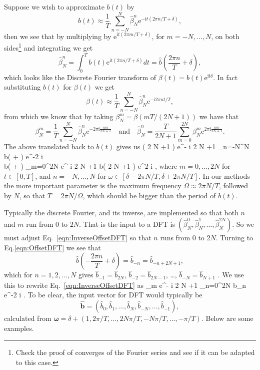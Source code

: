 \documentclass[ 12pt, a4paper]{article}
\newcommand{\be}{\begin{equation}}
\newcommand{\en}{\end{equation}}
\def\bga#1\ega{\begin{gather}#1\end{gather}} %
\newcommand{\ii}{\textrm{i}}
\newcommand{\ee}{\textrm{e}}
\renewcommand{\vec}[1]{\boldsymbol{#1}}
\begin{document}
Suppose we wish to approximate $b(t)$ by
\be
b(t) \approx \frac{1}{T}\sum_{n=-N}^N \hat \beta^n_N \ee^{-\ii t( 2 \pi n/T + \delta)},
\en
then we see that by multiplying by $\ee^{\ii t( 2 \pi m/T + \delta)}$, for $m= -N, \ldots, N$, on both sides\footnote{Check the proof of converges of the Fourier series and see if it can be adapted to this case.} and integrating we get
\be
\hat \beta^n_N = \int_0^T b(t) \ee^{\ii t( 2 \pi n/T + \delta)} dt = \hat b\left (\frac{ 2 \pi n}{T} + \delta \right),
\en
which looks like the Discrete Fourier transform of $\beta(t) = b(t)\ee^{\ii t \delta}$. In fact substituting $b(t)$ for $\beta(t)$ we get
\be
\beta(t) \approx \frac{1}{T}\sum_{n=-N}^N \hat \beta^n_N \ee^{-\ii  2 \pi n t /T },
\en
from which we know that by taking $\beta_N^m = \beta(m T /(2 N +1))$ we have that
\be
\beta_N^m = \frac{1}{T}\sum_{n=-N}^N \hat \beta^n_N \ee^{-2 \pi \ii \frac{n m}{2 N +1} } \quad \text{and}  \quad
 \hat \beta_N^n = \frac{T}{2N +1}\sum_{m=0}^{2N} \beta^m_N \ee^{2 \pi \ii \frac{n m}{2 N +1} }.
\en
 The above translated back to $b(t)$ gives us
\bga
b\left ( {2 N +1} \right) \approx \ee^{- \ii \delta {} {2 N +1}} \sum_{n=-N}^N  \hat b\left ( + \delta \right) \ee^{-2 \pi \ii {} } \quad {}
\label{eqn:InverseOffsetDFT} \\
 \hat b\left ( + \delta \right) \approx {}\sum_{m=0}^{2N} \ee^{ \ii \delta {} {2 N +1}}  b\left ( {2 N +1} \right)  \ee^{2 \pi \ii {} },
 \label{eqn:OffsetDFT}
\ega
where $m =0, \ldots, 2N$ for $t\in [0,T]$, and $n =-N, \ldots, N$ for $\omega \in [ \delta - 2 \pi N /T , \delta + 2 \pi N /T ]$. In our methods the more important parameter is the maximum frequency $\Omega \approx 2 \pi N /T$, followed by $N$, so that $T = 2 \pi N/  \Omega$, which should be bigger than the period of $b(t)$.

Typically the discrete Fourier, and its inverse, are implemented so that both $n$ and $m$ run from $0$ to $2N$. That is the input to a DFT is $(\hat \beta_N^0, \hat \beta_N^1, \ldots, \hat \beta_N^{2 N})$. So we must adjust Eq.~\eqref{eqn:InverseOffsetDFT} so that $n$ runs from $0$ to $2N$. Turning to Eq.\eqref{eqn:OffsetDFT} we see that
\[
\hat b\left ( -\frac{ 2 \pi n}{T} + \delta \right)  = \hat b_{-n} =  \hat b_{-n + 2N +1},
\]
which for $n = 1, 2, \ldots, N$ gives $\hat b_{-1} = \hat b_{2N}$, $ \hat b_{-2} = \hat b_{2N -1}$, \ldots, $ \hat b_{-N} = \hat b_{N +1}$ . We use this to rewrite Eq.~\eqref{eqn:InverseOffsetDFT} as
\bga
  b_m \approx \ee^{- \ii \delta {} {2 N +1}} \sum_{n=0}^{2N}  \hat b_n \ee^{-2 \pi \ii {} }.
  \label{eqn:InverseOffsetDFT}
\ega
To be clear, the input vector for DFT would typically be
\[
\hat{\vec b} = (\hat b_0, \hat b_1, \ldots, \hat b_N, \hat b_{-N}, \ldots, \hat b_{-1}),
\]
  calculated from $\vec \omega = \delta + (1,2\pi/T, \ldots, 2N \pi/T,- N \pi/T, \ldots,-  \pi/T )$.  Below are some examples.
\end{document}
